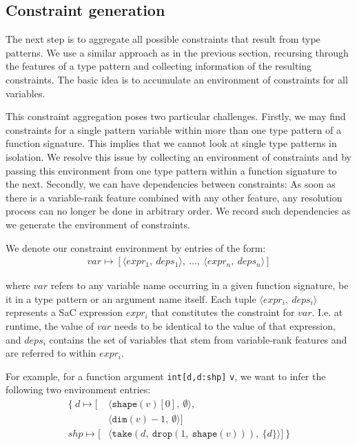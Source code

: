 \subsection{Constraint generation}\label{sec:gtc}

The next step is to aggregate all possible constraints that result from type patterns.
We use a similar approach as in the previous section, recursing through the features of a type pattern and collecting information of the resulting constraints.
The basic idea is to accumulate an environment of constraints for all variables.

This constraint aggregation poses two particular challenges.
Firstly, we may find constraints for a single pattern variable within more than one type pattern of a function signature.
This implies that we cannot look at single type patterns in isolation.
We resolve this issue by collecting an environment of constraints and by passing this environment from one type pattern within a function signature to the next.
Secondly, we can have dependencies between constraints:
As soon as there is a variable-rank feature combined with any other feature, any resolution process can no longer be done in arbitrary order. We record such dependencies as we generate the environment of constraints.

We denote our constraint environment by entries of the form:
\begin{align*}
    var \mapsto [\langle{}expr_1,\ deps_1\rangle,\ \dots,\ \langle{}expr_n,\ deps_n\rangle]
\end{align*}

\noindent
where $var$ refers to any variable name occurring in a given function signature, be it in a type pattern or an argument name itself.
Each tuple $\langle{} expr_i,\ deps_i \rangle$ represents a SaC expression $expr_i$ that constitutes the constraint for $var$.
I.e. at runtime, the value of $var$ needs to be identical to the value of that expression, and $deps_i$ contains the set of variables that stem from variable-rank features and are referred to within $expr_i$.

For example, for a function argument \texttt{int[d,d:shp]} \texttt{v}, we want to infer the following two environment entries:
\begin{align*}
    \mathbf{\{}\
        d   \mapsto [&\langle\texttt{shape}(v)[0],\ \emptyset\rangle, \\
                     &\langle\texttt{dim}(v)-1,\ \emptyset\rangle] \\
        shp \mapsto [&\langle\texttt{take}(d,\ \texttt{drop}(1,\ \texttt{shape}(v))),\ \{d\}\rangle]
    \ \mathbf{\}}
\end{align*}

